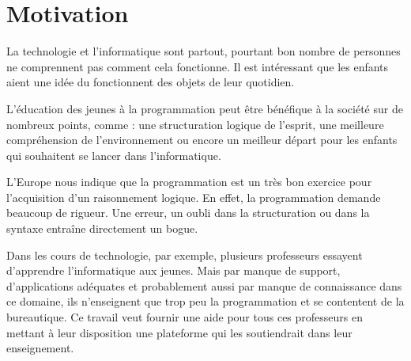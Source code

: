 \section{Motivation}
\label{intro-motivation}
La technologie et l'informatique sont partout, pourtant bon nombre de personnes ne comprennent pas comment cela fonctionne. Il est intéressant que les enfants aient une idée du fonctionnent des objets de leur quotidien.

L'éducation des jeunes à la programmation peut être bénéfique à la société sur de nombreux points, comme : une structuration logique de l'esprit, une meilleure compréhension de l'environnement ou encore un meilleur départ pour les enfants qui souhaitent se lancer dans l'informatique.

L'Europe \cite{rapport-europeen} nous indique que la programmation est un très bon exercice pour l'acquisition d'un raisonnement logique. En effet, la programmation demande beaucoup de rigueur. Une erreur, un oubli dans la structuration ou dans la syntaxe entraîne directement un bogue. %

Dans les cours de technologie, par exemple, plusieurs professeurs essayent d'apprendre l'informatique aux jeunes. Mais par manque de support, d'applications adéquates et probablement aussi par manque de connaissance dans ce domaine, ils n'enseignent que trop peu la programmation et se contentent de la bureautique. Ce travail veut fournir une aide pour tous ces professeurs en mettant à leur disposition une plateforme qui les soutiendrait dans leur enseignement.

